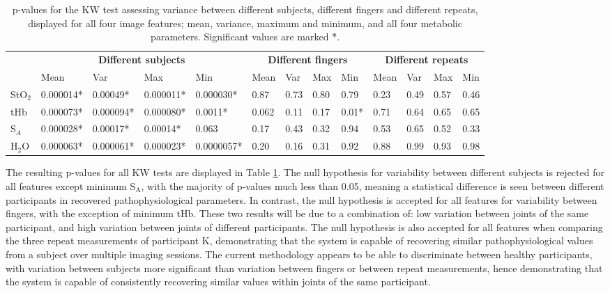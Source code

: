 \documentclass[twoside]{bhamthesis}
\theoremstyle{definition}
\begin{document}
\bgroup
\def\arraystretch{1.4}
\begin{table}[!ht]
\footnotesize
\caption{p-values for the KW test assessing variance between different subjects, different fingers and different repeats, displayed for all four image features; mean, variance, maximum and minimum, and all four metabolic parameters. Significant values are marked *.}
\begin{center}
 \begin{tabular}{|p{0.6cm}|  p{1.4cm} p{1.4cm} p{1.4cm} p{1.4cm}| p{0.6cm} p{0.6cm} p{0.6cm} p{0.6cm}| p{0.5cm} p{0.5cm} p{0.5cm} p{0.5cm}|} 
 \hline 
 & \multicolumn{4}{c|}{\textbf{Different subjects}}  & \multicolumn{4}{c|}{\textbf{Different fingers}} & \multicolumn{4}{c|}{\textbf{Different repeats}}  \\ 
 & Mean & Var & Max & Min & Mean & Var & Max & Min & Mean & Var & Max & Min \\ [1ex] 
 \hline
 StO$_2$ & 0.000014* & 0.00049* & 0.000011* & 0.000030* & 0.87 & 0.73 & 0.80 & 0.79  & 0.23 & 0.49 & 0.57 & 0.46 \\ 
 tHb &  0.000073* & 0.000094* & 0.000080* & 0.0011* & 0.062 & 0.11 & 0.17 & 0.01* & 0.71 & 0.64 & 0.65 & 0.65 \\
 S$_A$ & 0.000028* & 0.00017* & 0.00014* & 0.063  & 0.17 & 0.43 & 0.32 & 0.94 & 0.53 & 0.65 & 0.52 & 0.33 \\
 H$_2$O & 0.000063* & 0.000061* & 0.000023* & 0.0000057*  & 0.20 & 0.16 & 0.31 & 0.92 & 0.88 & 0.99 & 0.93 & 0.98 \\
 \hline
\end{tabular}
\end{center}
\label{Variability_table}
\end{table}

The resulting p-values for all KW tests are displayed in Table \ref{Variability_table}. The null hypothesis for variability between different subjects is rejected for all features except minimum $\mathrm{S_A}$, with the majority of p-values much less than 0.05, meaning a statistical difference is seen between different participants in recovered pathophysiological parameters. In contrast, the null hypothesis is accepted for all features for variability between fingers, with the exception of minimum tHb. These two results will be due to a combination of: low variation between joints of the same participant, and high variation between joints of different participants. The null hypothesis is also accepted for all features when comparing the three repeat measurements of participant K, demonstrating that the system is capable of recovering similar pathophysiological values from a subject over multiple imaging sessions. The current methodology appears to be able to discriminate between healthy participants, with variation between subjects more significant than variation between fingers or between repeat measurements, hence demonstrating that the system is capable of consistently recovering similar values within joints of the same participant. 
\end{document}
